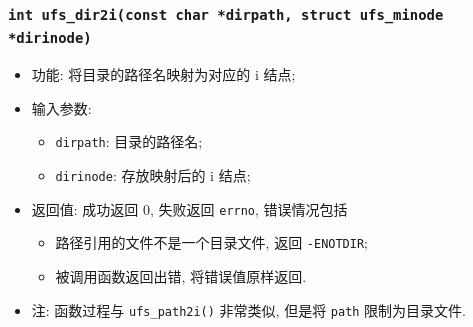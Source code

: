\documentclass[nofonts]{ctexart}
\begin{document}
  \subsubsection[\texttt{ufs\_dir2i}]{\texttt{int ufs\_dir2i(const char *dirpath, struct ufs\_minode *dirinode)}}

  \begin{itemize}
\item
  功能: 将目录的路径名映射为对应的 i 结点;
\item
  输入参数:

  \begin{itemize}
  \item
    \texttt{dirpath}: 目录的路径名;
  \item
    \texttt{dirinode}: 存放映射后的 i 结点;
  \end{itemize}
\item
  返回值: 成功返回 0, 失败返回 \texttt{errno}, 错误情况包括

  \begin{itemize}
  \item
    路径引用的文件不是一个目录文件, 返回 \texttt{-ENOTDIR};
  \item
    被调用函数返回出错, 将错误值原样返回.
  \end{itemize}
\item
  注: 函数过程与 \texttt{ufs\_path2i()} 非常类似, 但是将 \texttt{path}
  限制为目录文件.
  \end{itemize}
\end{document}
